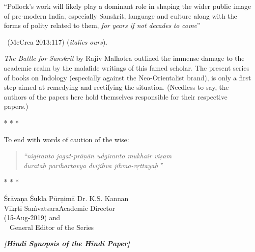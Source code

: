 
\begin{myquote}
“Pollock’s work will likely play a dominant role in shaping the wider public image of pre-modern India, especially Sanskrit, language and culture along with the forms of polity related to them, \textit{for years if not decades to come}” 

~\hfill (McCrea 2013:117) (\textit{italics ours}).
\end{myquote}

\textit{The Battle for Sanskrit} by Rajiv Malhotra outlined the immense damage to the academic realm by the malafide writings of this famed scholar. The present series of books on Indology (especially against the Neo-Orientalist brand), is only a first step aimed at remedying and rectifying the situation. (Needless to say, the authors of the papers here hold themselves responsible for their respective papers.)

\begin{center}
* * *
\end{center}

\noindent
To end with words of caution of the wise:
\smallskip

\begin{verse}
\textit{“nigiranto jagat-prāṇān udgiranto mukhair viṣam}  \\\textit{dūrataḥ parihartavyā dvijihvā jihma-vṛttayaḥ} ”
\end{verse}

\vskip 3pt

\begin{center}
* * *
\end{center}

\vskip 30pt

\noindent
Śrāvaṇa Śukla Pūrṇimā \hfill Dr. K.S. Kannan\\
Vikṛti Saṁvatsara\hfill Academic Director\\
(15-Aug-2019) \hfill and\\
\phantom{a}~ \hfill General Editor of the Series

\newpage

\begin{center}
\textbf{\textit{[Hindi Synopsis of the Hindi Paper]}}
\end{center}

\bgroup

\selectdev

\section*{}

